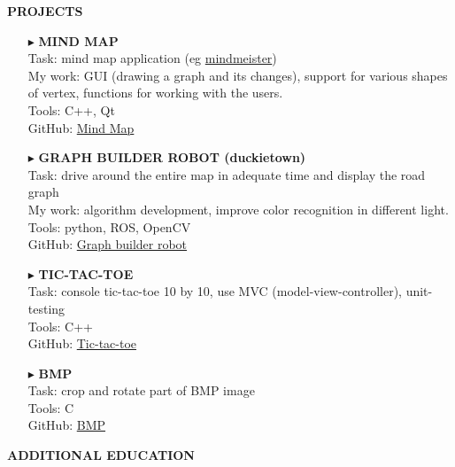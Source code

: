 \documentclass[a4paper,10pt]{article}
\begin{document}
	\colorbox{magicmint}{
		\begin{minipage}{0.96\textwidth}
			\vphantom{.}
			\textbf{PROJECTS}
		\end{minipage}
	}
	\begin{itemize}
	
		\item[$\blacktriangleright$] \textbf{MIND MAP}\\
		Task: mind map application (eg \href{https://www.mindmeister.com} {mindmeister})\\
		My work: GUI (drawing a graph and its changes), support for various shapes of vertex, functions for working with the users. \\
		Tools: C++, Qt\\
		GitHub: \href{https://github.com/Kira5005-code/Mind-Map} {Mind Map}
		
		\item[$\blacktriangleright$] \textbf{GRAPH BUILDER ROBOT (duckietown)}\\
		Task: drive around the entire map in adequate time and display the road graph\\
		My  work: algorithm development, improve color recognition in different light. \\
		Tools: python, ROS, OpenCV\\
		GitHub: \href{https://github.com/Kira5005-code/template-ros-core} {Graph builder robot}
		
		\item[$\blacktriangleright$] \textbf{TIC-TAC-TOE}\\
		Task: console tic-tac-toe 10 by 10, use MVC (model-view-controller), unit-testing\\
		Tools: C++\\
		GitHub: \href{https://github.com/Kira5005-code/Tic-tac-toe} {Tic-tac-toe}
		
		\item[$\blacktriangleright$] \textbf{BMP}\\
		Task: crop and rotate part of BMP image\\
		Tools: C\\
		GitHub: \href{https://github.com/Kira5005-code/BMP} {BMP}
	\end{itemize}

	\colorbox{magicmint}{
		\begin{minipage}{0.96\textwidth}
			\vphantom{.}
			\textbf{ADDITIONAL EDUCATION}
		\end{minipage}
	}
	
\end{document}
